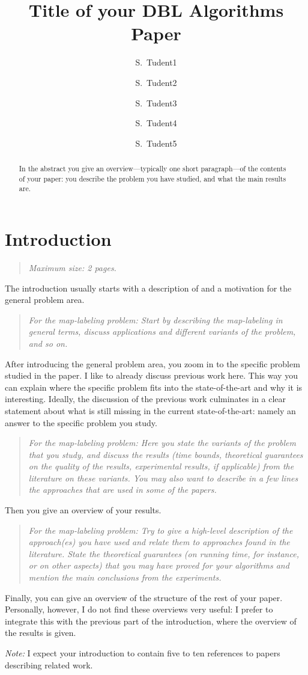 \documentclass[11pt]{article}
\title{Title of your DBL Algorithms Paper}
\author{S.~Tudent1 \and S.~Tudent2 \and S.~Tudent3 \and S.~Tudent4 \and S.~Tudent5}
\date{}
\newcommand{\maxsize}[1]{\begin{quotation} {\sl \noindent Maximum size: #1.} \end{quotation}}
\newcommand{\ml}[1]{\begin{quotation} {\sl \noindent For the map-labeling problem: #1} \end{quotation}}
\begin{document}
\maketitle

\begin{abstract}
In the abstract you give an overview---typically one short paragraph---of the contents of
your paper: you describe the problem you have studied, and what the main results are.
\end{abstract}



\section{Introduction}
\label{se:introduction}
\maxsize{2 pages}
The introduction usually starts with a description of and
a motivation for the general problem area.
%
\ml{Start by describing the map-labeling in general terms, discuss applications and
different variants of the problem, and so on.}
%
After introducing the general problem area, you zoom in to the specific problem
studied in the paper. I like to already discuss previous work here. This way
you can explain where the specific problem fits into the state-of-the-art
and why it is interesting. Ideally, the discussion of the previous work
culminates in a clear statement about what is still missing in the current
state-of-the-art: namely an answer to the specific problem you study.
%
\ml{Here you state the variants of the problem that you study, and discuss the results
(time bounds, theoretical guarantees on the quality of the results, experimental results,
if applicable) from the literature on these variants. You may also want to describe
in a few lines the approaches that are used in some of the papers.}
%
Then you give an overview of your results.
%
\ml{Try to give a high-level description of the
approach(es) you have used and relate them to approaches found in the literature.
State the theoretical guarantees (on running time,
for instance, or on other aspects) that you may have proved for your algorithms
and mention the main conclusions from the experiments.}
%
Finally, you can give an overview of the structure of the rest of your paper.
Personally, however, I do not find these overviews very useful: I prefer to
integrate this with the previous part of the introduction, where the overview
of the results is given.
\medskip

\emph{Note:} I expect your introduction to
contain five to ten references to papers describing related work.
\end{document}

